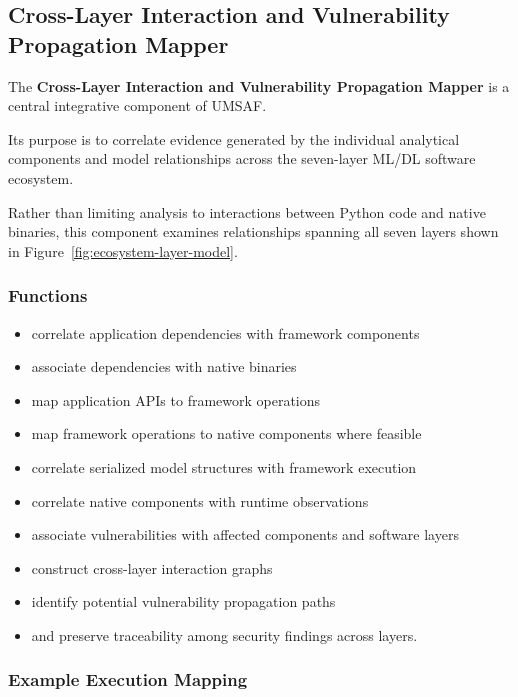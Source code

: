 \documentclass[
  12pt,
  letterpaper,
  oneside]{report}
\providecommand{\tightlist}{%
  \setlength{\itemsep}{0pt}\setlength{\parskip}{0pt}}
\begin{document}
\subsection{Cross-Layer Interaction and Vulnerability Propagation Mapper}\label{1037-cross-layer-interaction-and-vulnerability-propagation-mapper}

The \textbf{Cross-Layer Interaction and Vulnerability Propagation
Mapper} is a central integrative component of UMSAF.

Its purpose is to correlate evidence generated by the individual
analytical components and model relationships across the seven-layer
ML/DL software ecosystem.

Rather than limiting analysis to interactions between Python code and
native binaries, this component examines relationships spanning all
seven layers shown in Figure~\ref{fig:ecosystem-layer-model}.

\subsubsection{Functions}\label{functions-6}

\begin{itemize}
\tightlist
\item
  correlate application dependencies with framework components
\item
  associate dependencies with native binaries
\item
  map application APIs to framework operations
\item
  map framework operations to native components where feasible
\item
  correlate serialized model structures with framework execution
\item
  correlate native components with runtime observations
\item
  associate vulnerabilities with affected components and software layers
\item
  construct cross-layer interaction graphs
\item
  identify potential vulnerability propagation paths
\item
  and preserve traceability among security findings across layers.
\end{itemize}

\subsubsection{Example Execution
Mapping}\label{example-execution-mapping}
\end{document}
